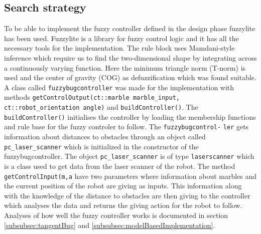 \documentclass[../Head/Main.tex]{subfiles}
\begin{document}
\subsection{Search strategy}
\label{subsec:searhStrategyImplementation}

To be able to implement the fuzzy controller defined in the design phase fuzzylite has been used. Fuzzylite is a library for fuzzy control logic and it has all the necessary tools for the implementation. The rule block uses Mamdani-style inference which require us to find the two-dimensional shape by integrating across a continuously varying function. Here the minimum triangle norm (T-norm) is used and the center of gravity (COG) as defuzzification which was found suitable. A class called \texttt{fuzzybugcontroller} was made for the implementation with methods \texttt{getControlOutput(ct::marble marble\_input, ct::robot\_orientation angle)} and \texttt{buildController()}. The \texttt{buildController()} initialises the controller by loading the membership functions and rule base for the fuzzy controler to follow. The \texttt{fuzzybugcontrol-} \texttt{ler} gets information about distances to obstacles through an object called \texttt{pc\_laser\_scanner} which is initialized in the constructor of the fuzzybugcontroller. The object \texttt{pc\_laser\_scanner} is of type \texttt{laserscanner} which is a class used to get data from the laser scanner of the robot. The method \texttt{getControlInput(m,a} have two parameters where information about marbles and the current position of the robot are giving as inputs. This information along with the knowledge of the distance to obstacles are then giving to the controller which analyses the data and returns the giving action for the robot to follow. Analyses of how well the fuzzy controller works is documented in section \ref{subsubsec:tangentBug} and \ref{subsubsec:modelBasedImplementation}.        	
\end{document}
